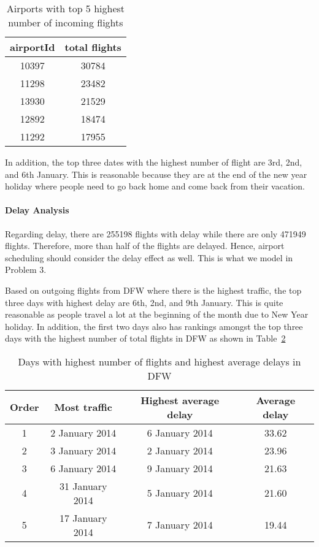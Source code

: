 \documentclass[11pt,a4paper]{article}
\begin{document}
\begin{table}
\caption{Airports with top 5 highest number of incoming flights}
\centering
\begin{tabular}{| c | c |}
\hline
airportId & total flights \\
\hline
10397&30784 \\
11298&23482 \\
13930&21529 \\
12892&18474 \\
11292&17955 \\
\hline
\end{tabular}
\label{fig:airport-flight-in}
\end{table}

In addition, the top three dates with the highest number of flight are 3rd, 2nd, and 6th January. This is reasonable because they are at the end of the new year holiday where people need to go back home and come back from their vacation.

\paragraph{Delay Analysis}
Regarding delay, there are 255198 flights with delay while there are only 471949 flights. Therefore, more than half of the flights are delayed. Hence, airport scheduling should consider the delay effect as well. This is what we model in Problem 3. \par
Based on outgoing flights from DFW where there is the highest traffic, the top three days with highest delay are 6th, 2nd, and 9th January. This is quite reasonable as people travel a lot at the beginning of the month due to New Year holiday. In addition, the first two days also has rankings amongst the top three days with the highest number of total flights in DFW as shown in Table~\ref{table:airport-dfw-delay}

\begin{table}
\caption{Days with highest number of flights and highest average delays in DFW}
\centering
\begin{tabular}{| c | c | c | c |}
\hline
Order & Most traffic & Highest average delay & Average delay \\
\hline
1 & 2 January 2014 & 6 January 2014 & 33.62\\
2 & 3 January 2014 & 2 January 2014 & 23.96\\
3 & 6 January 2014 & 9 January 2014 & 21.63\\
4 & 31 January 2014 & 5 January 2014 & 21.60\\
5 & 17 January 2014 & 7 January 2014 & 19.44\\
\hline
\end{tabular}
\label{table:airport-dfw-delay}
\end{table}
\end{document}
